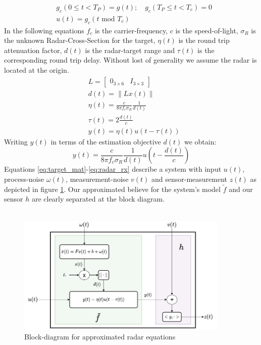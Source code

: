 \documentclass[oneside,12pt]{article}
\newcommand{\norm}[1]{\left\lVert#1\right\rVert}       %
\begin{document}
%
\begin{equation}
    \begin{split}
        &g_{c}(0 \leq t < T_P) = g(t); \quad g_{c}(T_P \leq t < T_c) = 0\\
        &u(t) = g_{c}(t \text{ mod } T_c) 
    \end{split}
\end{equation}
%
In the following equations $f_c$ is the carrier-frequency, $c$ is the speed-of-light, $\sigma_R$ is the unknown Radar-Cross-Section for the target, $\eta(t)$ is the round trip attenuation factor, $d(t)$ is the radar-target range and $\tau(t)$ is the corresponding round trip delay. Without lost of generality we assume the radar is located at the origin.
%
\begin{equation}\label{eq:Rx}
    \begin{split}
        &L = \begin{bmatrix} 0_{3 \times 6} & I_{3 \times 3} \end{bmatrix}\\
        &d(t) = \norm{L x(t)}\\
        &\eta(t) = \frac{c}{8 \pi f_c \sigma_R}\frac{1}{d(t)}\\
        &\tau(t) = 2\frac{d(t)}{c}\\
        &y(t) = \eta(t) u(t - \tau(t))
    \end{split}
\end{equation}
%
Writing $y(t)$ in terms of the estimation objective $d(t)$ we obtain:
%
\begin{equation}\label{eq:radar_rx}
    y(t) = \frac{c}{8 \pi f_c \sigma_R }\frac{1}{d(t)} u(t - \frac{d(t)}{c})
\end{equation}
%
Equations \ref{eq:target_mat}-\ref{eq:radar_rx} describe a system with input $u(t)$, process-noise $\omega(t)$, measurement-noise $v(t)$ and sensor-measurement $z(t)$ as depicted in figure \ref{fig:Radar_diagram}. Our approximated believe for the system's model $\tilde{f}$ and our sensor $h$ are clearly separated at the block diagram.\\\\
%
\begin{figure}
    \centering
        \includegraphics[width=0.9\textwidth]{./Radar_diagram}
        \caption{\label{fig:Radar_diagram}Block-diagram for approximated radar equations}
\end{figure}
\end{document}
